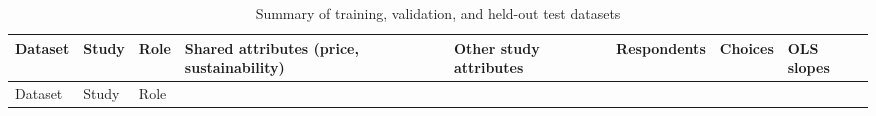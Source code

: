 \documentclass[
  11pt,
  letterpaper,
]{article}
\begin{document}
\begin{longtable}[]{@{}
  >{\raggedright\arraybackslash}p{}
  >{\raggedright\arraybackslash}p{}
  >{\raggedright\arraybackslash}p{}
  >{\raggedright\arraybackslash}p{}
  >{\raggedright\arraybackslash}p{}
  >{\raggedleft\arraybackslash}p{}
  >{\raggedleft\arraybackslash}p{}
  >{\raggedleft\arraybackslash}p{}@{}}
\caption{Summary of training, validation, and held-out test
datasets}\label{tbl-datasets}\tabularnewline
\toprule\noalign{}
\begin{minipage}[b]{\linewidth}\raggedright
Dataset
\end{minipage} & \begin{minipage}[b]{\linewidth}\raggedright
Study
\end{minipage} & \begin{minipage}[b]{\linewidth}\raggedright
Role
\end{minipage} & \begin{minipage}[b]{\linewidth}\raggedright
Shared attributes (price, sustainability)
\end{minipage} & \begin{minipage}[b]{\linewidth}\raggedright
Other study attributes
\end{minipage} & \begin{minipage}[b]{\linewidth}\raggedleft
Respondents
\end{minipage} & \begin{minipage}[b]{\linewidth}\raggedleft
Choices
\end{minipage} & \begin{minipage}[b]{\linewidth}\raggedleft
OLS slopes
\end{minipage} \\
\midrule\noalign{}
\endfirsthead
\toprule\noalign{}
\begin{minipage}[b]{\linewidth}\raggedright
Dataset
\end{minipage} & \begin{minipage}[b]{\linewidth}\raggedright
Study
\end{minipage} & \begin{minipage}[b]{\linewidth}\raggedright
Role
\end{minipage} & \begin{minipage}[b]{\linewidth}\raggedright

\end{minipage}
\end{longtable}
\end{document}
